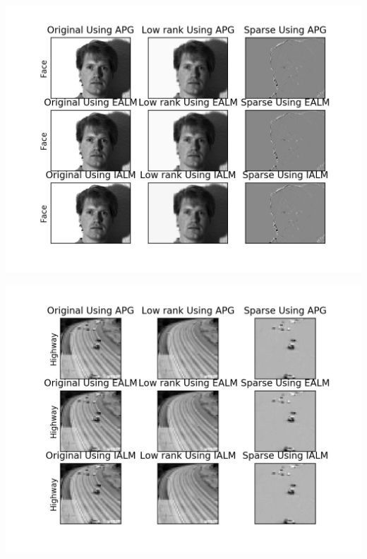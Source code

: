 \documentclass[oneside]{article}
\begin{document}
\includegraphics[scale =0.5]{face.png}

\includegraphics[scale =0.5]{highway.png}
\end{document}
